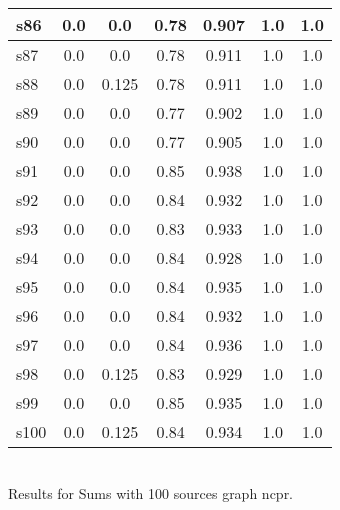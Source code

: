 \documentclass{article}
\begin{document}
\begin{tabular}{|l|c|c|c|c|c|c|}
\hline
s86 &0.0 & 0.0 & 0.78 & 0.907 & 1.0 & 1.0\\
\hline
s87 &0.0 & 0.0 & 0.78 & 0.911 & 1.0 & 1.0\\
\hline
s88 &0.0 & 0.125 & 0.78 & 0.911 & 1.0 & 1.0\\
\hline
s89 &0.0 & 0.0 & 0.77 & 0.902 & 1.0 & 1.0\\
\hline
s90 &0.0 & 0.0 & 0.77 & 0.905 & 1.0 & 1.0\\
\hline
s91 &0.0 & 0.0 & 0.85 & 0.938 & 1.0 & 1.0\\
\hline
s92 &0.0 & 0.0 & 0.84 & 0.932 & 1.0 & 1.0\\
\hline
s93 &0.0 & 0.0 & 0.83 & 0.933 & 1.0 & 1.0\\
\hline
s94 &0.0 & 0.0 & 0.84 & 0.928 & 1.0 & 1.0\\
\hline
s95 &0.0 & 0.0 & 0.84 & 0.935 & 1.0 & 1.0\\
\hline
s96 &0.0 & 0.0 & 0.84 & 0.932 & 1.0 & 1.0\\
\hline
s97 &0.0 & 0.0 & 0.84 & 0.936 & 1.0 & 1.0\\
\hline
s98 &0.0 & 0.125 & 0.83 & 0.929 & 1.0 & 1.0\\
\hline
s99 &0.0 & 0.0 & 0.85 & 0.935 & 1.0 & 1.0\\
\hline
s100 &0.0 & 0.125 & 0.84 & 0.934 & 1.0 & 1.0\\
\hline
\end{tabular}\\

\noindent Results for Sums with 100 sources graph ncpr.
\end{document}
